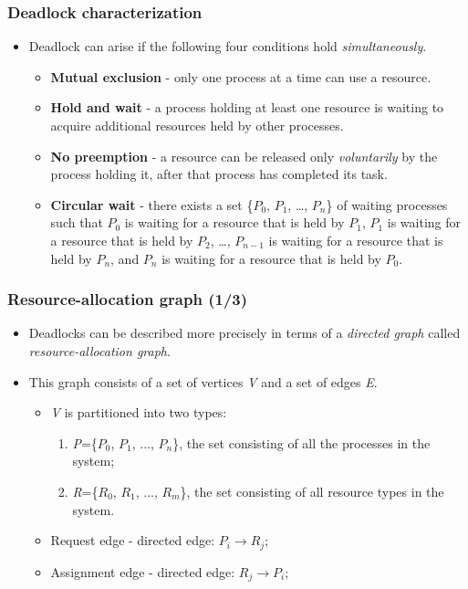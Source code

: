 \documentclass[CJKutf8,xcolor=pdftex,dvipsnames,table]{beamer}
\begin{document}
\begin{CJK*}{UTF8}{song}
  \begin{frame}
  \frametitle{Deadlock characterization} \pause
  \begin{itemize}
  \item{Deadlock can arise if the following four conditions hold \emph{simultaneously}.} \pause
    \begin{itemize}
    \item{\textbf{Mutual exclusion} \pause - only one process at a time can use a resource.} \pause
    \item{\textbf{Hold and wait} \pause - a process holding at least one resource is waiting to acquire additional resources held by other processes.} \pause
    \item{\textbf{No preemption} \pause - a resource can be released only \emph{voluntarily} by the process holding it, after that process has completed its task.} \pause
    \item{\textbf{Circular wait} \pause - there exists a set \{$P_0$, $P_1$, …, $P_n$\} of waiting processes such that $P_0$ is waiting for a resource that is held by $P_1$, $P_1$ is waiting for a resource that is held by $P_2$, …, $P_{n-1}$ is waiting for a resource that is held by $P_n$, and $P_n$ is waiting for a resource that is held by $P_0$.}
    \end{itemize}
  \end{itemize}
  \end{frame}
  
  \begin{frame}
  \frametitle{Resource-allocation graph (1/3)} \pause
  \begin{itemize}
  \item{Deadlocks can be described more precisely in terms of a \emph{directed graph} called \emph{resource-allocation graph}.} \pause
  \item{This graph consists of a set of vertices \emph{V} and a set of edges \emph{E}.} \pause
    \begin{itemize}
    \item{\emph{V} is partitioned into two types:} \pause
      \begin{enumerate}
      \item{\emph{P}=\{$P_0$, $P_1$, ..., $P_n$\}, the set consisting of all the processes in the system;} \pause
      \item{\emph{R}=\{$R_0$, $R_1$, ..., $R_m$\}, the set consisting of all resource types in the system.} \pause
      \end{enumerate}
    \item{Request edge \pause - directed edge: $P_i \rightarrow R_j$;} \pause
    \item{Assignment edge \pause - directed edge: $R_j \rightarrow P_i$;}
    \end{itemize}
  \end{itemize}
  \end{frame}
  

\end{CJK*}
\end{document}
